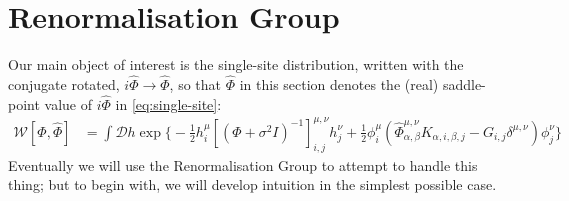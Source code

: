 \documentclass[../main.tex]{subfiles}
\begin{document}
\section{Renormalisation Group}
\label{sec:rg}

Our main object of interest is the single-site distribution, written with the conjugate rotated, $i \hat \Phi \to \hat \Phi$, so that $\hat \Phi$ in this section denotes the (real) saddle-point value of $i \hat \Phi$ in \eqref{eq:single-site}:
\begin{align*}
  \mathcal W[\Phi, \hat \Phi]
  &= 
  \int \mathcal{D} h \exp \Bigg \{
    - \frac12 h^{\mu}_i [(\Phi + \sigma^2 I)^{-1}]^{\mu,\nu}_{i,j} h^{\nu}_j 
    + \frac12 \phi^{\mu}_i \left( \hat \Phi^{\mu,\nu}_{\alpha,\beta} K_{\alpha,i,\beta,j} - G_{i,j} \delta^{\mu,\nu}  \right) \phi^{\nu}_j
  \Bigg \}
\end{align*}
Eventually we will use the Renormalisation Group to attempt to handle this thing; but to begin with, we will develop intuition in the simplest possible case.
\end{document}
